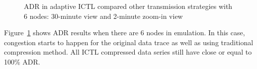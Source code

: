\documentclass[12pt]{report}
\begin{document}
\begin{figure}[H]
  \caption{\label{fig:adaptive_adr_6}ADR in adaptive ICTL compared other transmission strategies with 6 nodes: 30-minute view and 2-minute zoom-in view}
\end{figure}

Figure~\ref{fig:adaptive_adr_6} shows ADR results when there are 6 nodes in emulation. In this case, congestion starts to happen for the original data trace as well as using traditional compression method. All ICTL compressed data series still have close or equal to 100\% ADR.
\end{document}
